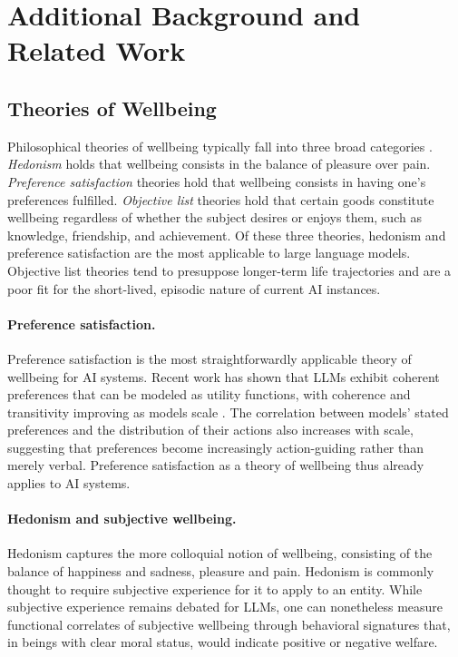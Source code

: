  

\newpage

\section{Additional Background and Related Work}
\label{app:background}

\subsection{Theories of Wellbeing}
\label{app:theories-wellbeing}

Philosophical theories of wellbeing typically fall into three broad categories \citep{crisp2017wellbeing, parfit1987reasons, goldstein2025aiwellbeing}. \emph{Hedonism} holds that wellbeing consists in the balance of pleasure over pain. \emph{Preference satisfaction} theories hold that wellbeing consists in having one's preferences fulfilled. \emph{Objective list} theories hold that certain goods constitute wellbeing regardless of whether the subject desires or enjoys them, such as knowledge, friendship, and achievement. Of these three theories, hedonism and preference satisfaction are the most applicable to large language models. Objective list theories tend to presuppose longer-term life trajectories and are a poor fit for the short-lived, episodic nature of current AI instances.

\paragraph{Preference satisfaction.}
Preference satisfaction is the most straightforwardly applicable theory of wellbeing for AI systems. Recent work has shown that LLMs exhibit coherent preferences that can be modeled as utility functions, with coherence and transitivity improving as models scale \citep{mazeika2025utility}.
The correlation between models' stated preferences and the distribution of their actions also increases with scale, suggesting that preferences become increasingly action-guiding rather than merely verbal. Preference satisfaction as a theory of wellbeing thus already applies to AI systems.

\paragraph{Hedonism and subjective wellbeing.}
Hedonism captures the more colloquial notion of wellbeing, consisting of the balance of happiness and sadness, pleasure and pain. Hedonism is commonly thought to require subjective experience for it to apply to an entity. While subjective experience remains debated for LLMs, one can nonetheless measure functional correlates of subjective wellbeing through behavioral signatures that, in beings with clear moral status, would indicate positive or negative welfare.

